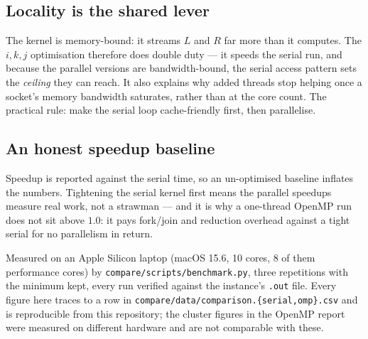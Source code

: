 \documentclass[twocolumn]{article}
\begin{document}
    \subsection{Locality is the shared lever}\label{subsec:locality}
    The kernel is memory-bound: it streams $L$ and $R$ far more than it computes. The
    $i,k,j$ optimisation therefore does double duty --- it speeds the serial run, and
    because the parallel versions are bandwidth-bound, the serial access pattern sets the
    \emph{ceiling} they can reach. It also explains why added threads stop helping once a
    socket's memory bandwidth saturates, rather than at the core count. The practical
    rule: make the serial loop cache-friendly first, then parallelise.

    \subsection{An honest speedup baseline}\label{subsec:baseline}
    Speedup is reported against the serial time, so an un-optimised baseline inflates the
    numbers. Tightening the serial kernel first means the parallel speedups measure real
    work, not a strawman --- and it is why a one-thread OpenMP run does not sit above
    $1.0$: it pays fork/join and reduction overhead against a tight serial for no
    parallelism in return.

    Measured on an Apple Silicon laptop (macOS 15.6, 10 cores, 8 of them performance
    cores) by \texttt{compare/scripts/benchmark.py}, three repetitions with the minimum
    kept, every run verified against the instance's \texttt{.out} file. Every figure here
    traces to a row in \texttt{compare/data/comparison.\{serial,omp\}.csv} and is
    reproducible from this repository; the cluster figures in the OpenMP report were
    measured on different hardware and are not comparable with these.

    \begin{table}[!h]
        \caption{\label{tab:serial-baseline}The serial baseline against a one-thread
        OpenMP run --- \textbf{this laptop} (time, s).}
        \centering
    \end{table}
\end{document}
